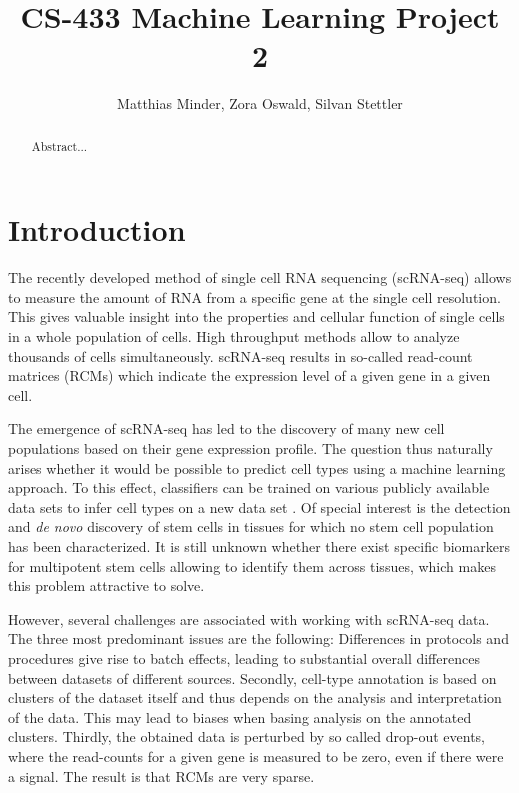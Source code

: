 \documentclass[10pt,conference,compsocconf]{IEEEtran}
\begin{document}
\title{CS-433 Machine Learning Project 2}

\author{
	Matthias Minder, Zora Oswald, Silvan Stettler\\
}

\maketitle

\begin{abstract}
	Abstract...
\end{abstract}

\section*{Introduction} 
The recently developed method of single cell RNA sequencing (scRNA-seq) allows to measure the amount of RNA from a specific gene at the single cell resolution. This gives valuable insight into the properties and cellular function of single cells in a whole population of cells. High throughput methods allow to analyze thousands of cells simultaneously. scRNA-seq results in so-called read-count matrices (RCMs) which indicate the expression level of a given gene in a given cell.
\par 
The emergence of scRNA-seq has led to the discovery of many new cell populations based on their gene expression profile. The question thus naturally arises whether it would be possible to predict cell types using a machine learning approach. To this effect, classifiers can be trained on various publicly available data sets to infer cell types on a new data set \cite{Schwalie2017}. Of special interest is the detection and \textit{de novo} discovery of stem cells in tissues for which no stem cell population has been characterized. It is still unknown whether there exist specific biomarkers for multipotent stem cells allowing to identify them across tissues, which makes this problem attractive to solve. 
\par
However, several challenges are associated with working with scRNA-seq data. The three most predominant issues are the following: Differences in protocols and procedures give rise to batch effects, leading to substantial overall differences between datasets of different sources. Secondly, cell-type annotation is based on clusters of the dataset itself and thus depends on the  analysis and interpretation of the data. This may lead to biases when basing analysis on the annotated clusters. Thirdly, the obtained data is perturbed by so called drop-out events, where the read-counts for a given gene is measured to be zero, even if there were a signal. The result is that RCMs are very sparse. 
\end{document}
